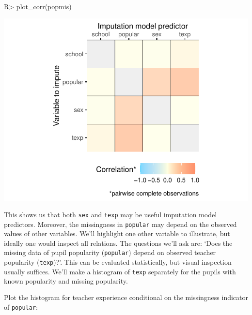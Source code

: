 \documentclass[
]{jss}
\begin{document}
\begin{CodeChunk}
\begin{CodeInput}
R> plot_corr(popmis)
\end{CodeInput}


\begin{center}\includegraphics{Imputation_of_Incomplete_Multilevel_Data_files/figure-latex/pop-corr-1} \end{center}

\end{CodeChunk}

This shows us that both \texttt{sex} and \texttt{texp} may be useful
imputation model predictors. Moreover, the missingness in
\texttt{popular} may depend on the observed values of other variables.
We'll highlight one other variable to illustrate, but ideally one would
inspect all relations. The questions we'll ask are: `Does the missing
data of pupil popularity (\texttt{popular}) depend on observed teacher
popularity (\texttt{texp})?'. This can be evaluated statistically, but
visual inspection usually suffices. We'll make a histogram of
\texttt{texp} separately for the pupils with known popularity and
missing popularity.

Plot the histogram for teacher experience conditional on the missingness
indicator of \texttt{popular}:
\end{document}
